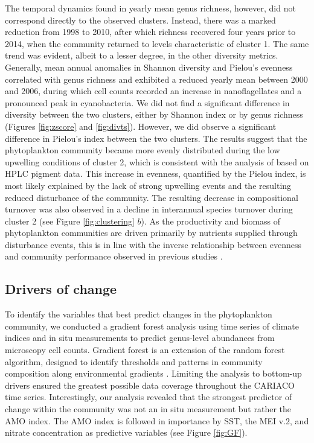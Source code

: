 \documentclass[draft]{agujournal2019}
\begin{document}
    
    The temporal dynamics found in yearly mean genus richness, however, did not correspond directly to the observed clusters. Instead, there was a marked reduction from 1998 to 2010, after which richness recovered four years prior to 2014, when the community returned to levels characteristic of cluster 1. The same trend was evident, albeit to a lesser degree, in the other diversity metrics. Generally, mean annual anomalies in Shannon diversity and Pielou's evenness correlated with genus richness and exhibited a reduced yearly mean between 2000 and 2006, during which cell counts recorded an increase in nanoflagellates and a pronounced peak in cyanobacteria.
    We did not find a significant difference in diversity between the two clusters, either by Shannon index or by genus richness (Figures \ref{fig:zscore} and \ref{fig:divts}). However, we did observe a significant difference in Pielou's index between the two clusters. The results suggest that the phytoplankton community became more evenly distributed during the low upwelling conditions of cluster 2, which is consistent with the analysis of  based on HPLC pigment data. This increase in evenness, quantified by the Pielou index, is most likely explained by the lack of strong upwelling events and the resulting reduced disturbance of the community. The resulting decrease in compositional turnover was also observed in a decline in interannual species turnover during cluster 2 (see Figure \ref{fig:clustering} $b$). As the productivity and biomass of phytoplankton communities are driven primarily by nutrients supplied through disturbance events, this is in line with the inverse relationship between evenness and community performance observed in previous studies \cite{lehtinen_phytoplankton_2017, otero_phytoplankton_2020}.
    
    

\subsection{Drivers of change}
    To identify the variables that best predict changes in the phytoplankton community, we conducted a gradient forest analysis using time series of climate indices and in situ measurements to predict genus-level abundances from microscopy cell counts. Gradient forest is an extension of the random forest algorithm, designed to identify thresholds and patterns in community composition along environmental gradients \cite{ellis_gradient_2012}. Limiting the analysis to bottom-up drivers ensured the greatest possible data coverage throughout the CARIACO time series. Interestingly, our analysis revealed that the strongest predictor of change within the community was not an in situ measurement but rather the AMO index. The AMO index is followed in importance by SST, the MEI v.2, and nitrate concentration as predictive variables (see Figure \ref{fig:GF}).
    
\end{document}

